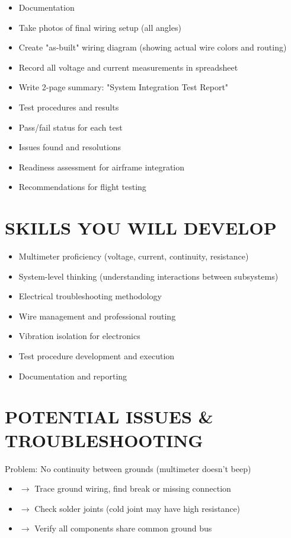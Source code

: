 \documentclass[11pt,letterpaper]{article}
\begin{document}
\begin{itemize}
  \item Documentation
  \item Take photos of final wiring setup (all angles)
  \item Create "as-built" wiring diagram (showing actual wire colors and routing)
  \item Record all voltage and current measurements in spreadsheet
  \item Write 2-page summary: "System Integration Test Report"
  \item Test procedures and results
  \item Pass/fail status for each test
  \item Issues found and resolutions
  \item Readiness assessment for airframe integration
  \item Recommendations for flight testing
\end{itemize}

\section{SKILLS YOU WILL DEVELOP}

\begin{itemize}
  \item Multimeter proficiency (voltage, current, continuity, resistance)
  \item System-level thinking (understanding interactions between subsystems)
  \item Electrical troubleshooting methodology
  \item Wire management and professional routing
  \item Vibration isolation for electronics
  \item Test procedure development and execution
  \item Documentation and reporting
\end{itemize}

\section{POTENTIAL ISSUES \& TROUBLESHOOTING}

Problem: No continuity between grounds (multimeter doesn't beep)\par

\begin{itemize}
  \item $\rightarrow$ Trace ground wiring, find break or missing connection
  \item $\rightarrow$ Check solder joints (cold joint may have high resistance)
  \item $\rightarrow$ Verify all components share common ground bus
\end{itemize}
\end{document}
